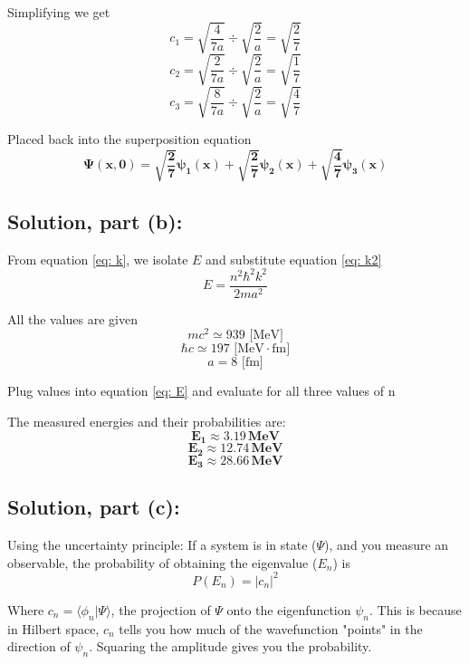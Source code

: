 \documentclass[12pt]{article}
\begin{document}
        Simplifying we get
        \[
            c_1 = \sqrt{\frac{4}{7a}} \div \sqrt{\frac{2}{a}} = \sqrt{\frac{2}{7}}
        \]
        \[
            c_2 = \sqrt{\frac{2}{7a}} \div \sqrt{\frac{2}{a}} = \sqrt{\frac{1}{7}}
        \]
        \[
            c_3 = \sqrt{\frac{8}{7a}} \div \sqrt{\frac{2}{a}} = \sqrt{\frac{4}{7}}
        \]

        Placed back into the superposition equation
        \[
            \boldsymbol{\boxed{\Psi(x,0) = \sqrt{\frac{2}{7}} \psi_1(x) + \sqrt{\frac{2}{7}} \psi_2(x) + \sqrt{\frac{4}{7}} \psi_3(x)}}
        \]

    \subsection{Solution, part (b):}
        From equation \ref{eq: k}, we isolate $E$ and substitute equation \ref{eq: k2}
        \begin{equation} \label{eq: E}
            E = \frac{n^2 \hbar^2 k^2}{2 m a^2}
        \end{equation}

        All the values are given
        \[
            mc^2 \simeq 939 \text{ [MeV]}
        \]
        \[
            \hbar c \simeq 197 \text{ [MeV}\cdot \text{fm]}
        \]
        \[
            a = 8 \text{ [fm]}
        \]
        
        Plug values into equation \ref{eq: E} and evaluate for all three values of n

        The measured energies and their probabilities are:
        \[
            \boldsymbol{\boxed{E_1 \approx 3.19\, \text{MeV}}}
        \]
        \[
            \boldsymbol{\boxed{E_2 \approx 12.74\, \text{MeV}}}
        \]
        \[
            \boldsymbol{\boxed{E_3 \approx 28.66\, \text{MeV}}}
        \]
  
    \subsection{Solution, part (c):}
        Using the uncertainty principle:
        If a system is in state ($\Psi$), and you measure an observable, the probability of obtaining the eigenvalue ($E_n$) is
        \begin{equation} \label{eq: P}
            P(E_n) = |c_n|^2            
        \end{equation}

        Where $c_n = \langle \phi_n | \Psi \rangle$, the projection of $\Psi$ onto the eigenfunction $\psi_n$. This is because in Hilbert space, $c_n$ tells you how much of the wavefunction "points" in the direction of $\psi_n$. Squaring the amplitude gives you the probability.
\end{document}
